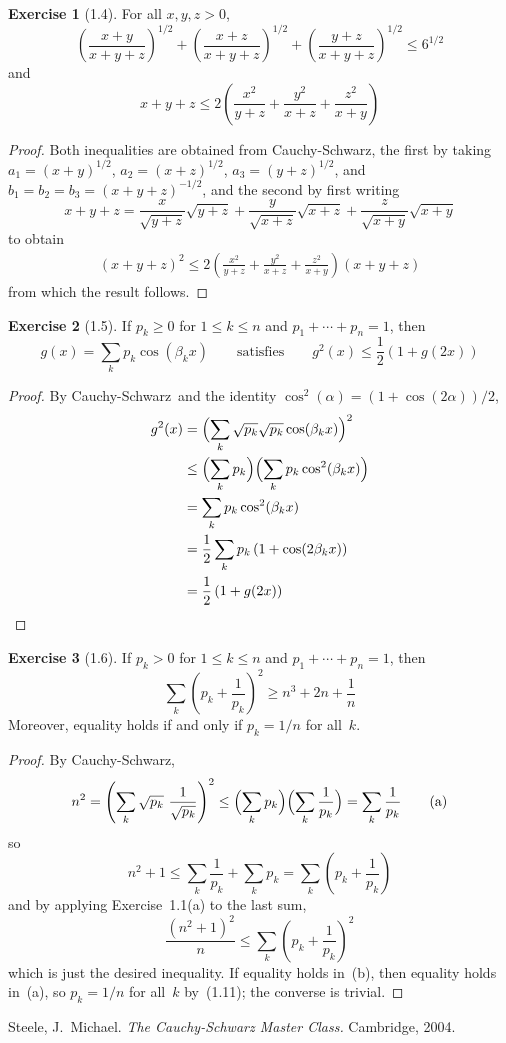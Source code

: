 \documentclass[letterpaper,12pt]{article}
\newcommand{\CS}{Cauchy-Schwarz}
\newcommand{\Biglp}[1]{\Bigl({#1}\Bigr)}
\theoremstyle{definition}
\newtheorem*{exer}{Exercise}
\theoremstyle{remark}
\begin{document}
\begin{exer}[1.4]
For all \(x,y,z>0\),
\[\left(\frac{x+y}{x+y+z}\right)^{1/2}+\left(\frac{x+z}{x+y+z}\right)^{1/2}+\left(\frac{y+z}{x+y+z}\right)^{1/2}\le 6^{1/2}\tag{a}\]
and
\[x+y+z\le 2\left(\frac{x^2}{y+z}+\frac{y^2}{x+z}+\frac{z^2}{x+y}\right)\tag{b}\]
\end{exer}
\begin{proof}
Both inequalities are obtained from \CS, the first by taking \(a_1=(x+y)^{1/2}\), \(a_2=(x+z)^{1/2}\), \(a_3=(y+z)^{1/2}\), and \(b_1=b_2=b_3=(x+y+z)^{-1/2}\), and the second by first writing
\[x+y+z=\frac{x}{\sqrt{y+z}}\sqrt{y+z}+\frac{y}{\sqrt{x+z}}\sqrt{x+z}+\frac{z}{\sqrt{x+y}}\sqrt{x+y}\]
to obtain
\begin{align*}
(x+y+z)^2\le2\left(\frac{x^2}{y+z}+\frac{y^2}{x+z}+\frac{z^2}{x+y}\right)(x+y+z)
\end{align*}
from which the result follows.
\end{proof}

\begin{exer}[1.5]
If \(p_k\ge 0\) for \(1\le k\le n\) and \(p_1+\cdots+p_n=1\), then
\[g(x)=\sum_k p_k\cos(\beta_k x)\qquad\text{satisfies}\qquad g^2(x)\le\frac{1}{2}\left(1+g(2x)\right)\]
\end{exer}
\begin{proof}
By \CS\ and the identity \(\cos^2(\alpha)=(1+\cos(2\alpha))/2\),
\begin{align*}
g^2(x)&=\Biglp{\sum_k\sqrt{p_k}\sqrt{p_k}\cos(\beta_k x)}^2\\
	&\le\Biglp{\sum_k p_k}\Biglp{\sum_k p_k\cos^2(\beta_k x)}\\
	&=\sum_k p_k\cos^2(\beta_k x)\\
	&=\frac{1}{2}\sum_k p_k\left(1+\cos(2\beta_k x)\right)\\
	&=\frac{1}{2}\left(1+g(2x)\right)\qedhere
\end{align*}
\end{proof}

\begin{exer}[1.6]
If \(p_k>0\) for \(1\le k\le n\) and \(p_1+\cdots+p_n=1\), then
\[\sum_k\left(p_k+\frac{1}{p_k}\right)^2\ge n^3+2n+\frac{1}{n}\]
Moreover, equality holds if and only if \(p_k=1/n\) for all~\(k\).
\end{exer}
\begin{proof}
By \CS,
\[n^2=\left(\sum_k\sqrt{p_k}\ \frac{1}{\sqrt{p_k}}\right)^2\le\Biglp{\sum_k p_k}\Biglp{\sum_k\frac{1}{p_k}}=\sum_k\frac{1}{p_k}\tag{a}\]
so
\[n^2+1\le\sum_k\frac{1}{p_k}+\sum_k p_k=\sum_k\left(p_k+\frac{1}{p_k}\right)\]
and by applying Exercise~1.1(a) to the last sum,
\[\frac{(n^2+1)^2}{n}\le\sum_k\left(p_k+\frac{1}{p_k}\right)^2\tag{b}\]
which is just the desired inequality. If equality holds in~(b), then equality holds in~(a), so \(p_k=1/n\) for all~\(k\) by~(1.11); the converse is trivial.
\end{proof}

\begin{thebibliography}{0}
 Steele, J.~Michael. \textit{The Cauchy-Schwarz Master Class.} Cambridge, 2004.
\end{thebibliography}
\end{document}
